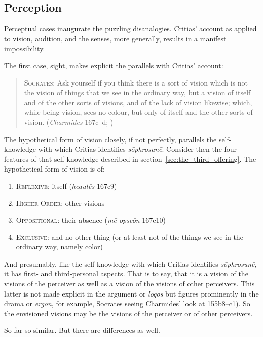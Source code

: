 
\subsection{Perception} %
\label{sub:perception}

Perceptual cases inaugurate the puzzling disanalogies. Critias' account as applied to vision, audition, and the senses, more generally, results in a manifest impossibility.

The first case, sight, makes explicit the parallels with Critias' account:
\begin{quote}
	\textsc{Socrates}: Ask yourself if you think there is a sort of vision which is not the vision of things that we see in the ordinary way, but a vision of itself and of the other sorts of visions, and of the lack of vision likewise; which, while being vision, sees no colour, but only of itself and the other sorts of vision. (\emph{Charmides} 167c–d; \citealt[59]{Lamb:1927qw})
\end{quote}
The hypothetical form of vision closely, if not perfectly, parallels the self-knowledge with which Critias identifies \emph{sōphrosunē}. Consider then the four features of that self-knowledge described in section~\ref{sec:the_third_offering}. The hypothetical form of vision is of:
\begin{enumerate}[(1)]
	\item \textsc{Reflexive}: itself (\emph{heautēs} 167c9)
	\item \textsc{Higher-Order}: other visions
	\item \textsc{Oppositional}: their absence (\emph{mē opseōn} 167c10)
	\item \textsc{Exclusive}: and no other thing (or at least not of the things we see in the ordinary way, namely color)
\end{enumerate}
And presumably, like the self-knowledge with which Critias identifies \emph{sōphrosunē}, it has first- and third-personal aspects. That is to say, that it is a vision of the visions of the perceiver as well as a vision of the visions of other perceivers. This latter is not made explicit in the argument or \emph{logos} but figures prominently in the drama or \emph{ergon}, for example, Socrates seeing Charmides' look at 155b8–c1). So the envisioned visions may be the visions of the perceiver or of other perceivers.

So far so similar. But there are differences as well.

